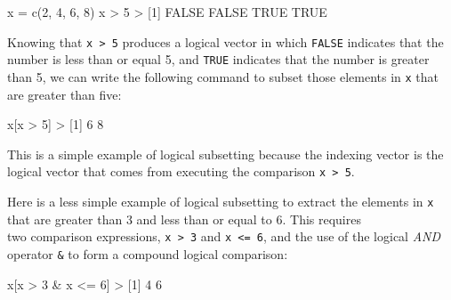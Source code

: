 \documentclass[
]{book}
\newenvironment{Shaded}{\begin{snugshade}}{\end{snugshade}}
\newcommand{\ConstantTok}[1]{\textcolor[rgb]{0.00,0.00,0.00}{#1}}
\newcommand{\DecValTok}[1]{\textcolor[rgb]{0.00,0.00,0.81}{#1}}
\newcommand{\FunctionTok}[1]{\textcolor[rgb]{0.00,0.00,0.00}{#1}}
\newcommand{\NormalTok}[1]{#1}
\newcommand{\OtherTok}[1]{\textcolor[rgb]{0.56,0.35,0.01}{#1}}
\newcommand{\SpecialCharTok}[1]{\textcolor[rgb]{0.00,0.00,0.00}{#1}}
\begin{document}
\begin{Shaded}
\begin{Highlighting}[]
\NormalTok{x }\OtherTok{=} \FunctionTok{c}\NormalTok{(}\DecValTok{2}\NormalTok{, }\DecValTok{4}\NormalTok{, }\DecValTok{6}\NormalTok{, }\DecValTok{8}\NormalTok{)}
\NormalTok{x }\SpecialCharTok{\textgreater{}} \DecValTok{5}
\SpecialCharTok{\textgreater{}}\NormalTok{ [}\DecValTok{1}\NormalTok{] }\ConstantTok{FALSE} \ConstantTok{FALSE}  \ConstantTok{TRUE}  \ConstantTok{TRUE}
\end{Highlighting}
\end{Shaded}

Knowing that \texttt{x\ \textgreater{}\ 5} produces a logical vector in which \texttt{FALSE} indicates that
the number is less than or equal 5, and \texttt{TRUE} indicates that the number
is greater than 5, we can write the following command to subset those
elements in \texttt{x} that are greater than five:

\begin{Shaded}
\begin{Highlighting}[]
\NormalTok{x[x }\SpecialCharTok{\textgreater{}} \DecValTok{5}\NormalTok{]}
\SpecialCharTok{\textgreater{}}\NormalTok{ [}\DecValTok{1}\NormalTok{] }\DecValTok{6} \DecValTok{8}
\end{Highlighting}
\end{Shaded}

This is a simple example of logical subsetting because the indexing vector
is the logical vector that comes from executing the comparison \texttt{x\ \textgreater{}\ 5}.

Here is a less simple example of logical subsetting to extract the elements in
\texttt{x} that are greater than 3 and less than or equal to 6. This requires\\
two comparison expressions, \texttt{x\ \textgreater{}\ 3} and \texttt{x\ \textless{}=\ 6}, and the use of the logical
\emph{AND} operator \texttt{\&} to form a compound logical comparison:

\begin{Shaded}
\begin{Highlighting}[]
\NormalTok{x[x }\SpecialCharTok{\textgreater{}} \DecValTok{3} \SpecialCharTok{\&}\NormalTok{ x }\SpecialCharTok{\textless{}=} \DecValTok{6}\NormalTok{]}
\SpecialCharTok{\textgreater{}}\NormalTok{ [}\DecValTok{1}\NormalTok{] }\DecValTok{4} \DecValTok{6}
\end{Highlighting}
\end{Shaded}
\end{document}
